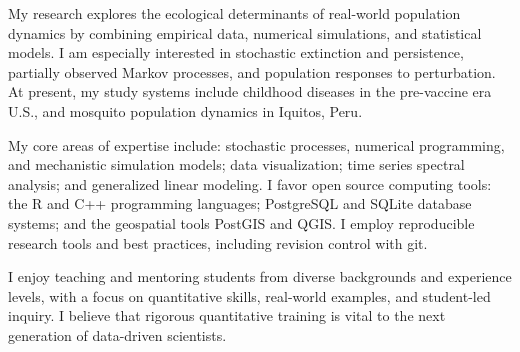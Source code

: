 My research explores the ecological determinants of real-world population
dynamics by combining empirical data, numerical simulations, and statistical
models.  I am especially interested in stochastic extinction and persistence,
partially observed Markov processes, and population responses to perturbation.
At present, my study systems include childhood diseases in the pre-vaccine era
U.S., and mosquito population dynamics in Iquitos, Peru.

My core areas of expertise include: stochastic processes, numerical
programming, and mechanistic simulation models;
data visualization; time series
spectral analysis; and generalized linear modeling.  I favor open source
computing tools: the R and C++ programming languages; PostgreSQL and SQLite
database systems; and the geospatial tools PostGIS and QGIS.  I employ
reproducible research tools and best practices, including revision control with
git.

I enjoy teaching and mentoring students from diverse backgrounds and
experience levels, with a focus on quantitative skills, real-world examples, and
student-led inquiry.  I believe that rigorous quantitative training is vital
to the next generation of data-driven scientists.
